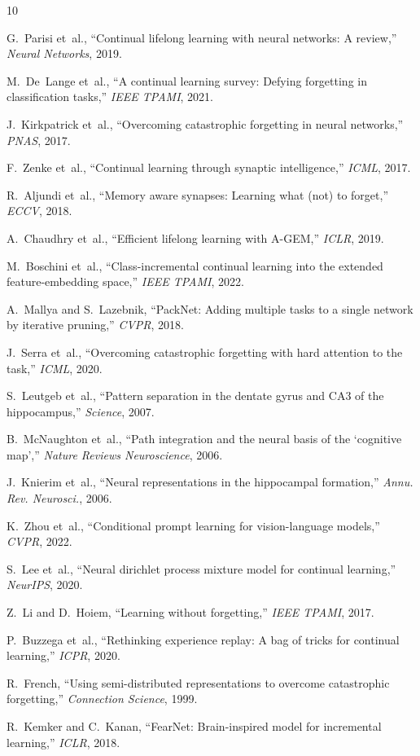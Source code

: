 \documentclass[letterpaper, 10pt, times]{article}
\begin{document}

\begin{thebibliography}{10}

G.~Parisi et~al., ``Continual lifelong learning with neural networks: A review,'' \emph{Neural Networks}, 2019.

M.~De~Lange et~al., ``A continual learning survey: Defying forgetting in classification tasks,'' \emph{IEEE TPAMI}, 2021.

J.~Kirkpatrick et~al., ``Overcoming catastrophic forgetting in neural networks,'' \emph{PNAS}, 2017.

F.~Zenke et~al., ``Continual learning through synaptic intelligence,'' \emph{ICML}, 2017.

R.~Aljundi et~al., ``Memory aware synapses: Learning what (not) to forget,'' \emph{ECCV}, 2018.

A.~Chaudhry et~al., ``Efficient lifelong learning with A-GEM,'' \emph{ICLR}, 2019.

M.~Boschini et~al., ``Class-incremental continual learning into the extended feature-embedding space,'' \emph{IEEE TPAMI}, 2022.

A.~Mallya and S.~Lazebnik, ``PackNet: Adding multiple tasks to a single network by iterative pruning,'' \emph{CVPR}, 2018.

J.~Serra et~al., ``Overcoming catastrophic forgetting with hard attention to the task,'' \emph{ICML}, 2020.

S.~Leutgeb et~al., ``Pattern separation in the dentate gyrus and CA3 of the hippocampus,'' \emph{Science}, 2007.

B.~McNaughton et~al., ``Path integration and the neural basis of the `cognitive map','' \emph{Nature Reviews Neuroscience}, 2006.

J.~Knierim et~al., ``Neural representations in the hippocampal formation,'' \emph{Annu. Rev. Neurosci.}, 2006.

K.~Zhou et~al., ``Conditional prompt learning for vision-language models,'' \emph{CVPR}, 2022.

S.~Lee et~al., ``Neural dirichlet process mixture model for continual learning,'' \emph{NeurIPS}, 2020.

Z.~Li and D.~Hoiem, ``Learning without forgetting,'' \emph{IEEE TPAMI}, 2017.

P.~Buzzega et~al., ``Rethinking experience replay: A bag of tricks for continual learning,'' \emph{ICPR}, 2020.

R.~French, ``Using semi-distributed representations to overcome catastrophic forgetting,'' \emph{Connection Science}, 1999.

R.~Kemker and C.~Kanan, ``FearNet: Brain-inspired model for incremental learning,'' \emph{ICLR}, 2018.

\end{thebibliography}
\end{document}
